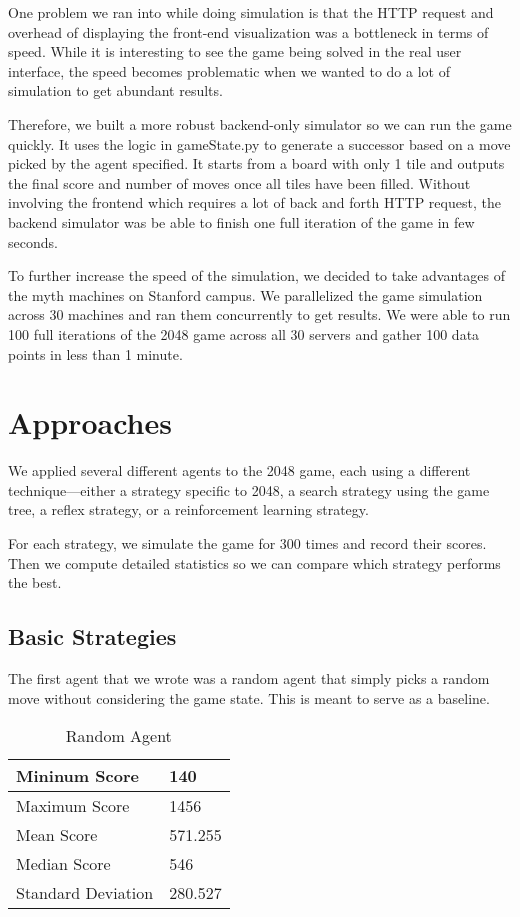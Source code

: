 \documentclass[9pt,twocolumn]{article}
\begin{document}
One problem we ran into while doing simulation is that the HTTP request and overhead of displaying the front-end visualization was a bottleneck in terms of speed. While it is interesting to see the game being solved in the real user interface, the speed becomes problematic when we wanted to do a lot of simulation to get abundant results.

Therefore, we built a more robust backend-only simulator so we can run the game quickly. It uses the logic in gameState.py to generate a successor based on a move picked by the agent specified. It starts from a board with only 1 tile and outputs the final score and number of moves once all tiles have been filled. Without involving the frontend which requires a lot of back and forth HTTP request, the backend simulator was be able to finish one full iteration of the game in few seconds.

To further increase the speed of the simulation, we decided to take advantages of the myth machines on Stanford campus. We parallelized the game simulation across 30 machines and ran them concurrently to get results. We were able to run 100 full iterations of the 2048 game across all 30 servers and gather 100 data points in less than 1 minute.

\section{Approaches}

We applied several different agents to the 2048 game, each using a different technique—either a strategy specific to 2048, a search strategy using the game tree, a reflex strategy, or a reinforcement learning strategy.

For each strategy, we simulate the game for 300 times and record their scores. Then we compute detailed statistics so we can compare which strategy performs the best.

\subsection{Basic Strategies}

The first agent that we wrote was a random agent that simply picks a random move without considering the game state. This is meant to serve as a baseline.

\begin{table}[!htbp]

\centering

\begin{tabular}{|l|l|}
\hline
Mininum Score      & 140 \\ \hline
Maximum Score      & 1456 \\ \hline
Mean Score         & 571.255 \\ \hline
Median Score       & 546 \\ \hline
Standard Deviation & 280.527 \\ \hline
\end{tabular}

\caption{Random Agent}

\end{table}
\end{document}
